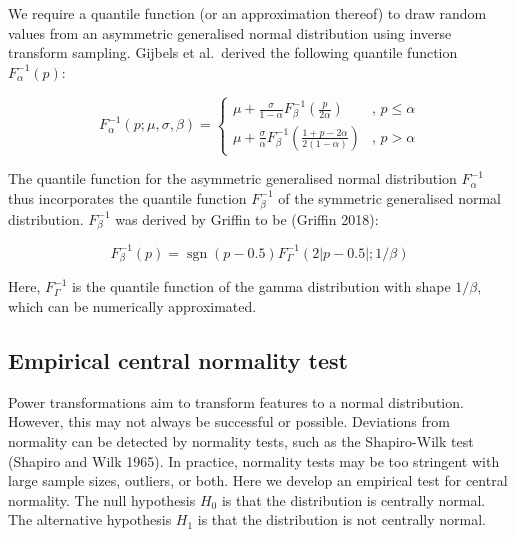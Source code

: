 \documentclass[
  a4paper,
]{article}
\DeclareMathOperator{\sgn}{sgn}
\begin{document}
We require a quantile function (or an approximation thereof) to draw
random values from an asymmetric generalised normal distribution using
inverse transform sampling. Gijbels et al.~derived the following
quantile function \(F_{\alpha}^{-1}(p)\):

\begin{equation}
F_{\alpha}^{-1}(p; \mu, \sigma, \beta) =
\begin{cases}
\mu + \frac{\sigma}{1 - \alpha} F_{\beta}^{-1} \left( \frac{p}{2 \alpha}\right) & \text{, } p \leq \alpha \\
\mu + \frac{\sigma}{\alpha} F_{\beta}^{-1} \left( \frac{1 + p - 2 \alpha}{2 \left(1 - \alpha \right)} \right) & \text{, } p > \alpha
\end{cases}
\end{equation}

The quantile function for the asymmetric generalised normal distribution
\(F_{\alpha}^{-1}\) thus incorporates the quantile function
\(F_{\beta}^{-1}\) of the symmetric generalised normal distribution.
\(F_{\beta}^{-1}\) was derived by Griffin to be (Griffin 2018):

\begin{equation}
F_{\beta}^{-1}(p) = \sgn\left(p - 0.5 \right) F_{\Gamma}^{-1}\left(2 \left|p - 0.5 \right|; 1 / \beta \right)
\end{equation}

Here, \(F_{\Gamma}^{-1}\) is the quantile function of the gamma
distribution with shape \(1 / \beta\), which can be numerically
approximated.

\subsection{Empirical central normality
test}\label{empirical-central-normality-test}

Power transformations aim to transform features to a normal
distribution. However, this may not always be successful or possible.
Deviations from normality can be detected by normality tests, such as
the Shapiro-Wilk test (Shapiro and Wilk 1965). In practice, normality
tests may be too stringent with large sample sizes, outliers, or both.
Here we develop an empirical test for central normality. The null
hypothesis \(H_0\) is that the distribution is centrally normal. The
alternative hypothesis \(H_1\) is that the distribution is not centrally
normal.
\end{document}
